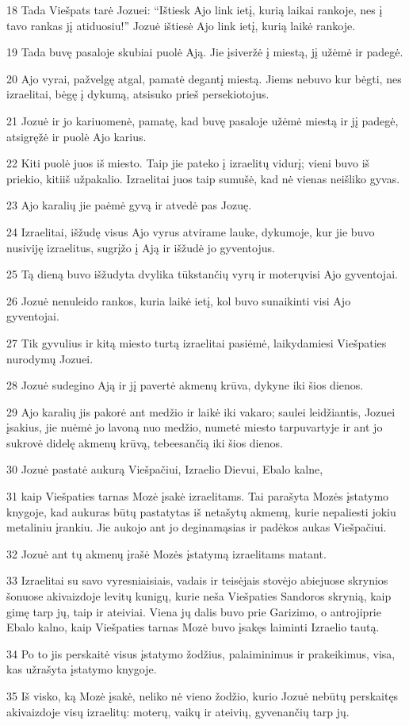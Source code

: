 \par 18 Tada Viešpats tarė Jozuei: “Ištiesk Ajo link ietį, kurią laikai rankoje, nes į tavo rankas jį atiduosiu!” Jozuė ištiesė Ajo link ietį, kurią laikė rankoje. 
\par 19 Tada buvę pasaloje skubiai puolė Ają. Jie įsiveržė į miestą, jį užėmė ir padegė. 
\par 20 Ajo vyrai, pažvelgę atgal, pamatė degantį miestą. Jiems nebuvo kur bėgti, nes izraelitai, bėgę į dykumą, atsisuko prieš persekiotojus. 
\par 21 Jozuė ir jo kariuomenė, pamatę, kad buvę pasaloje užėmė miestą ir jį padegė, atsigręžė ir puolė Ajo karius. 
\par 22 Kiti puolė juos iš miesto. Taip jie pateko į izraelitų vidurį; vieni buvo iš priekio, kiti­iš užpakalio. Izraelitai juos taip sumušė, kad nė vienas neišliko gyvas. 
\par 23 Ajo karalių jie paėmė gyvą ir atvedė pas Jozuę. 
\par 24 Izraelitai, išžudę visus Ajo vyrus atvirame lauke, dykumoje, kur jie buvo nusiviję izraelitus, sugrįžo į Ają ir išžudė jo gyventojus. 
\par 25 Tą dieną buvo išžudyta dvylika tūkstančių vyrų ir moterų­visi Ajo gyventojai. 
\par 26 Jozuė nenuleido rankos, kuria laikė ietį, kol buvo sunaikinti visi Ajo gyventojai. 
\par 27 Tik gyvulius ir kitą miesto turtą izraelitai pasiėmė, laikydamiesi Viešpaties nurodymų Jozuei. 
\par 28 Jozuė sudegino Ają ir jį pavertė akmenų krūva, dykyne iki šios dienos. 
\par 29 Ajo karalių jis pakorė ant medžio ir laikė iki vakaro; saulei leidžiantis, Jozuei įsakius, jie nuėmė jo lavoną nuo medžio, numetė miesto tarpuvartyje ir ant jo sukrovė didelę akmenų krūvą, tebeesančią iki šios dienos. 
\par 30 Jozuė pastatė aukurą Viešpačiui, Izraelio Dievui, Ebalo kalne, 
\par 31 kaip Viešpaties tarnas Mozė įsakė izraelitams. Tai parašyta Mozės įstatymo knygoje, kad aukuras būtų pastatytas iš netašytų akmenų, kurie nepaliesti jokiu metaliniu įrankiu. Jie aukojo ant jo deginamąsias ir padėkos aukas Viešpačiui. 
\par 32 Jozuė ant tų akmenų įrašė Mozės įstatymą izraelitams matant. 
\par 33 Izraelitai su savo vyresniaisiais, vadais ir teisėjais stovėjo abiejuose skrynios šonuose akivaizdoje levitų kunigų, kurie neša Viešpaties Sandoros skrynią, kaip gimę tarp jų, taip ir ateiviai. Viena jų dalis buvo prie Garizimo, o antroji­prie Ebalo kalno, kaip Viešpaties tarnas Mozė buvo įsakęs laiminti Izraelio tautą. 
\par 34 Po to jis perskaitė visus įstatymo žodžius, palaiminimus ir prakeikimus, visa, kas užrašyta įstatymo knygoje. 
\par 35 Iš visko, ką Mozė įsakė, neliko nė vieno žodžio, kurio Jozuė nebūtų perskaitęs akivaizdoje visų izraelitų: moterų, vaikų ir ateivių, gyvenančių tarp jų.



